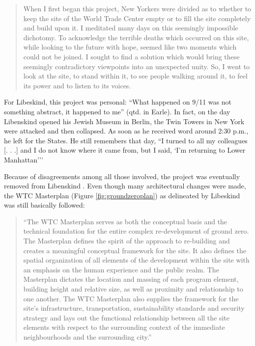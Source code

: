 \begin{quote}
When I first began this project, New Yorkers were divided as to whether
to keep the site of the World Trade Center empty or to fill the site
completely and build upon it.  I meditated many days on this seemingly
impossible dichotomy.  To acknowledge the terrible deaths which
occurred on this site, while looking to the future with hope, seemed
like two moments which could not be joined.  I sought to find a
solution which would bring these seemingly contradictory viewpoints
into an unexpected unity.  So, I went to look at the site, to stand
within it, to see people walking around it, to feel its power and to
listen to its voices. \citep{libeskind2012}
\end{quote}

For Libeskind, this project was personal: “What happened on 9/11 was
not something abstract, it happened to me” (qtd. in
Earle). In fact, on the day Libenskind opened his
Jewish Museum in Berlin, the Twin Towers in New York were attacked and
then collapsed.  As soon as he received word around 2:30 p.m., he left
for the States.  He still  remembers that day, ``I turned
to all my colleagues [. . .] and I do not know where it came from, but
I said, `I'm returning to Lower
Manhattan{'}'' \citep{huffpost2012}

Because of disagreements among all those involved, the project was
eventually removed from Libenskind \citep{huffpost2012}.  Even though
many architectural changes were made, the WTC Masterplan (Figure \ref{fig:groundzeroplan}) as
delineated by Libeskind was still basically followed: 

\begin{quote}
``The WTC Masterplan serves as both the conceptual
basis and the technical foundation for the entire complex
re-development of ground zero.  The Masterplan defines the spirit of
the approach to re-building and creates a meaningful conceptual
framework for the site.  It also defines the spatial organization of
all elements of the development within the site with an emphasis on the
human experience and the public realm.  The Masterplan dictates the
location and massing of each program element, building height and
relative size, as well as proximity and relationship to one another. 
The WTC Masterplan also supplies the framework for the site’s
infrastructure, transportation, sustainability standards and security
strategy and lays out the functional relationship between all the site
elements with respect to the surrounding context of the immediate
neighbourhoods and the surrounding city.'' \citep{libeskind2011}
\end{quote}

